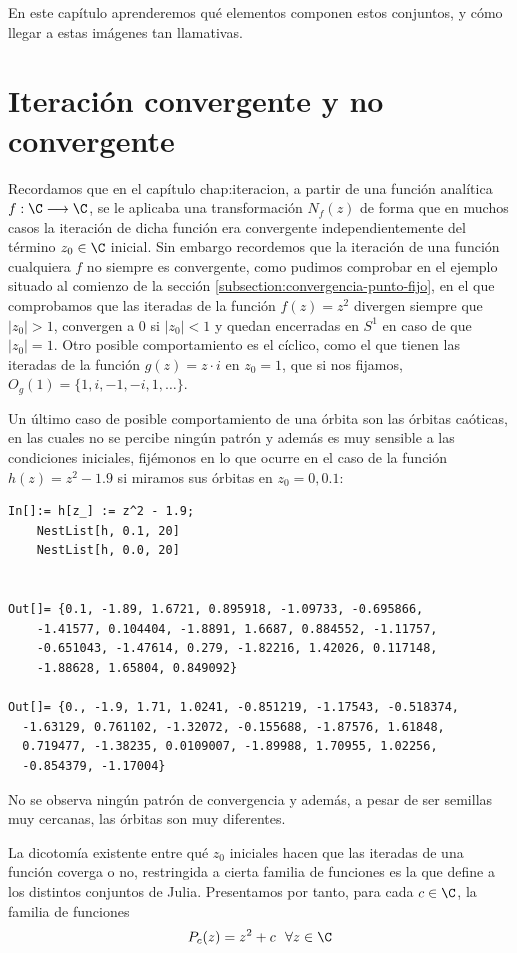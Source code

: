 En este capítulo aprenderemos qué elementos componen estos conjuntos, y cómo llegar a estas imágenes tan llamativas.

\section{Iteración convergente y no convergente}

Recordamos que en el capítulo \refname{chap:iteracion}, a partir de una función analítica $f:\C\longrightarrow\C$, se le aplicaba una transformación $N_f(z)$ de forma que en muchos casos la iteración de dicha función era convergente independientemente del término $z_0\in\C$ inicial. Sin embargo recordemos que la iteración de una función cualquiera $f$ no siempre es convergente, como pudimos comprobar en el ejemplo situado al comienzo de la sección \ref{subsection:convergencia-punto-fijo}, en el que comprobamos que las iteradas de la función $f(z)=z^2$ divergen siempre que $|z_0|>1$, convergen a $0$ si $|z_0|<1$ y quedan encerradas en $S^1$ en caso de que $|z_0|=1$. Otro posible comportamiento es el cíclico, como el que tienen las iteradas de la función $g(z)=z\cdot i$ en $z_0=1$, que si nos fijamos, $O_g(1)=\{1,i,-1,-i,1,\dots\}$. 

Un último caso de posible comportamiento de una órbita son las órbitas caóticas, en las cuales no se percibe ningún patrón y además es muy sensible a las condiciones iniciales, fijémonos en lo que ocurre en el caso de la función $h(z)=z^2-1.9$ si miramos sus órbitas en $z_0=0,0.1$:

\begin{verbatim}
In[]:= h[z_] := z^2 - 1.9;
    NestList[h, 0.1, 20]
    NestList[h, 0.0, 20]


Out[]= {0.1, -1.89, 1.6721, 0.895918, -1.09733, -0.695866,
    -1.41577, 0.104404, -1.8891, 1.6687, 0.884552, -1.11757, 
    -0.651043, -1.47614, 0.279, -1.82216, 1.42026, 0.117148, 
    -1.88628, 1.65804, 0.849092}

Out[]= {0., -1.9, 1.71, 1.0241, -0.851219, -1.17543, -0.518374, 
  -1.63129, 0.761102, -1.32072, -0.155688, -1.87576, 1.61848, 
  0.719477, -1.38235, 0.0109007, -1.89988, 1.70955, 1.02256, 
  -0.854379, -1.17004}
\end{verbatim}

No se observa ningún patrón de convergencia y además, a pesar de ser semillas muy cercanas, las órbitas son muy diferentes.

La dicotomía existente entre qué $z_0$ iniciales hacen que las iteradas de una función coverga o no, restringida a cierta familia de funciones es la que define a los distintos conjuntos de Julia. Presentamos por tanto, para cada $c\in\C$, la familia de funciones
\begin{equation}
  P_c(z) = z^2 +c \ \ \forall z\in\C
\end{equation}

